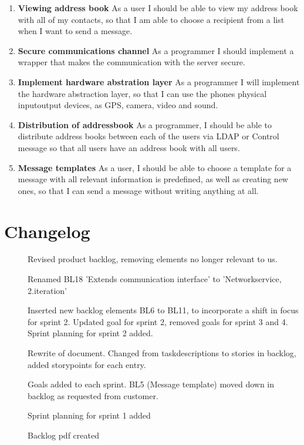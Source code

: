\begin{enumerate}
			\item {\bf Viewing address book} As a user I should be able to view my address book with all of my contacts, so that I am able to choose a recipient from a list when I want to send a message.
			\item {\bf Secure communications channel} As a programmer I should implement a wrapper that makes the communication with the server secure.
			\item {\bf Implement hardware abstration layer} As a programmer I will implement the hardware abstraction layer, so that I can use the phones physical input\/output devices, as GPS, camera, video and sound.
			\item {\bf Distribution of addressbook} As a programmer, I should be able to distribute address books between each of the users via LDAP or Control message so that all users have an address book with all users.
			\item {\bf Message templates} As a user, I should be able to choose a template for a message with all relevant information is predefined, as well as creating new ones, so that I can send a message without writing anything at all.
		\end{enumerate}
		\section{Changelog}
		\begin{description}
			\item[] Revised product backlog, removing elements no longer relevant to us.
			\item[] Renamed BL18 'Extends communication interface' to 'Networkservice, 2.iteration'
			\item[] Inserted new backlog elements BL6 to BL11, to incorporate a shift in focus for sprint 2. Updated goal for sprint 2, removed goals for sprint 3 and 4. Sprint planning for sprint 2 added.
			\item[] Rewrite of document. Changed from taskdescriptions to stories in backlog, added storypoints for each entry. 
			\item[] Goals added to each sprint. BL5 (Message template) moved down in backlog as requested from customer.
			\item[] Sprint planning for sprint 1 added
			\item[] Backlog pdf created
		\end{description}